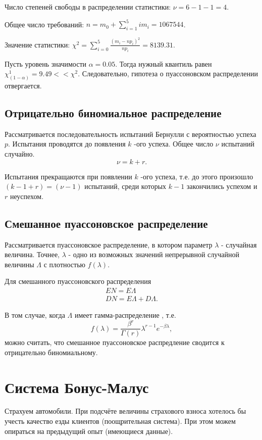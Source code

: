 Число степеней свободы в распределении статистики: $\nu = 6 - 1 -1 = 4$. 

Общее число требований: $n = m_0 + \sum\limits_{i=1}^{5}im_i = 1067544$.

Значение статистики: $\chi^2 = \sum\limits_{i=0}^{5}\frac{(m_i-np_i)^2}{np_i} = 8139.31$.

Пусть уровень значимости $\alpha = 0.05.$ Тогда нужный квантиль равен $ \chi^1_{(1 - \alpha)} = 9.49 << \chi^2.$ Следовательно, гипотеза о пуассоновском распределении отвергается.

\subsection{Отрицательно биномиальное распределение}

Рассматривается последовательность испытаний Бернулли с вероятностью успеха $p$. Испытания проводятся до появления $k$ -ого успеха. Общее число $\nu$ испытаний случайно.
\[\nu = k + r.\]

Испытания прекращаются при появлении $k$ -ого успеха, т.е. до этого произошло $(k-1+r) = (\nu -1)$ испытаний, среди которых $k-1$ закончились успехом и $r$ неуспехом.


\subsection{Смешанное пуассоновское распределение}
Рассматривается пуассоновское распределение, в котором параметр $\lambda$ - случайная величина. Точнее, $\lambda$ - одно из возможных значений непрерывной случайной величины $\Lambda$ с плотностью $f(\lambda)$.

\begin{remark}
	Для смешанного пуассоновского распределения
	\begin{gather*}
		EN = E\Lambda\\
		DN = E\Lambda + D\Lambda.
	\end{gather*}
\end{remark}

В том случае, когда $\Lambda$ имеет гамма-распределение , т.е.
\[ f(\lambda) = \frac{\beta^r}{\Gamma(r)}\lambda^{r-1}e^{-\beta\lambda}, \]
можно считать, что смешанное пуассоновское распредление сводится к отрицательно биномиальному.

\section{Система Бонус-Малус} %
Страхуем автомобили. При подсчёте величины страхового взноса хотелось бы учесть качество езды клиентов (поощрительная система). При этом можем опираться на предыдущий опыт (имеющиеся данные).

